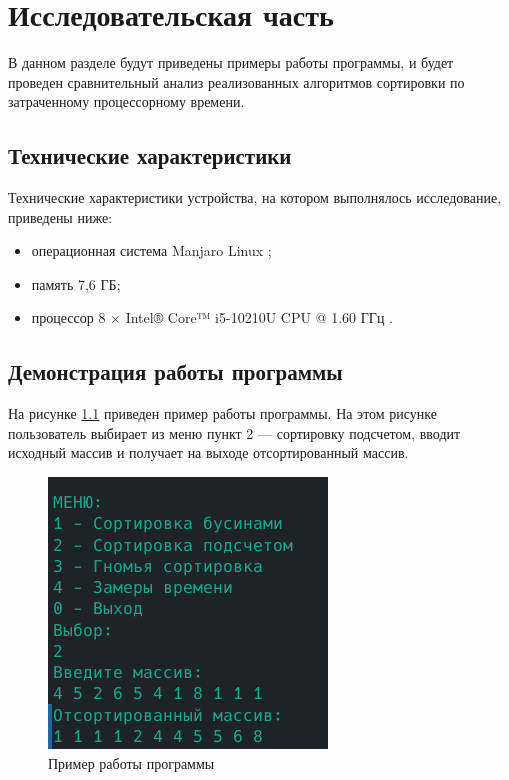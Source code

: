 \chapter{Исследовательская часть}

В данном разделе будут приведены примеры работы программы, и будет проведен сравнительный анализ реализованных алгоритмов сортировки по затраченному процессорному времени.

\section{Технические характеристики}

Технические характеристики устройства, на котором выполнялось исследование, приведены ниже:

\begin{itemize}
	\item операционная система Manjaro Linux \cite{manjaro};
	\item память 7,6 ГБ;
	\item процессор 8 × Intel® Core™ i5-10210U CPU @ 1.60 ГГц \cite{intel}.
\end{itemize}

\clearpage

\section{Демонстрация работы программы}

На рисунке \ref{img:example} приведен пример работы программы. На этом рисунке пользователь выбирает из меню пункт 2 --- сортировку подсчетом, вводит исходный массив и получает на выходе отсортированный массив.

\begin{figure}[H]
	\begin{center}
		\includegraphics[scale=1]{img/example.png}
	\end{center}
	\captionsetup{justification=centering}
	\caption{Пример работы программы}
	\label{img:example}
\end{figure}

